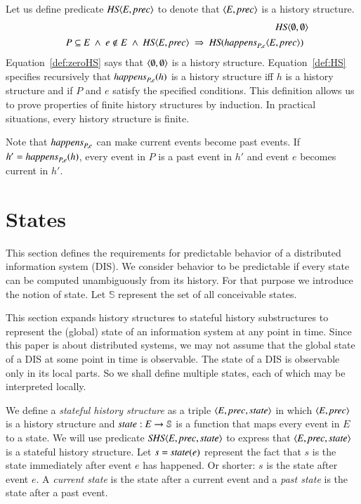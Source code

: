 \documentclass{elsarticle}
\def\id#1{\text{\it #1\/}}
\def\Events{{\mathit E}}
\begin{document}
	Let us define predicate $\id{HS}\la \Events, \id{prec}\ra$
	to denote that $\la \Events, \id{prec}\ra$ is a history structure.
\begin{eqnarray}
	&&\id{HS}\la \emptyset, \emptyset\ra\label{def:zeroHS}\\
&&\begin{array}{@{}l}
	P\subseteq\Events\ \wedge\ e\notin E\ \wedge\ \id{HS}\la \Events, \id{prec}\ra\ \Rightarrow\ \id{HS}(\id{happens}_{P,e}\la \Events, \id{prec}\ra)
\end{array}
\label{def:HS}
\end{eqnarray}
	Equation~\ref{def:zeroHS} says that $\langle \emptyset, \emptyset\rangle$ is a history structure.
	Equation~\ref{def:HS} specifies recursively that $\id{happens}_{P,e}(h)$ is a history structure iff
	$h$ is a history structure and if $P$ and $e$ satisfy the specified conditions.
	This definition allows us to prove properties of finite history structures by induction.
	In practical situations, every history structure is finite.

	Note that $\id{happens}_{P,e}$ can make current events become past events.
	If $h'=\id{happens}_{P,e}(h)$, every event in $P$ is a past event in $h'$ and event $e$ becomes current in $h'$.

\section{States}
	This section defines the requirements for predictable behavior of a distributed information system (DIS).
	We consider behavior to be predictable if every state can be computed unambiguously from its history.
	For that purpose we introduce the notion of state.
	Let $\mathbb S$ represent the set of all conceivable states.

	This section expands history structures to stateful history substructures
	to represent the (global) state of an information system at any point in time.
	Since this paper is about distributed systems,
	we may not assume that the global state of a DIS at some point in time is observable.
	The state of a DIS is observable only in its local parts.
	So we shall define multiple states, each of which may be interpreted locally.

	We define a {\em stateful history structure} as a triple $\la\Events, \id{prec}, \id{state}\ra$ in which
	$\la \Events, \id{prec}\ra$ is a history structure and $\id{state}:\Events\rightarrow{\mathbb S}$ is a function
	that maps every event in $\Events$ to a state.
	We will use predicate $\id{SHS}\la \Events, \id{prec}, \id{state}\ra$
	to express that $\la \Events, \id{prec}, \id{state}\ra$ is a stateful history structure.
	Let $s=\id{state}(e)$ represent the fact that $s$ is the state immediately after event $e$ has happened.
	Or shorter: $s$ is the state after event $e$.
	A {\em current state} is the state after a current event
	and a {\em past state} is the state after a past event.
\end{document}

